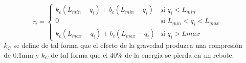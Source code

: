  \begin{equation}
     \tau_{i} = \begin{cases}
     k_c\left( L_{min}-q_i\right) + b_c\left( L_{min}-q_i\right) & \text{si }  q_i < L_{min}\\
     0 & \text{si }  L_{min} < q_i < L_{max}\\
     k_c\left( L_{max}-q_i\right) + b_c\left( L_{max}-q_i\right) & \text{si }  q_i > Lmax
     \end{cases}
 \end{equation}
 $k_C$ se define de tal forma que el efecto de la gravedad produzca una compresión de 0.1mm y $k_C$ de tal forma que el 40\% de la energía se pierda en un rebote.